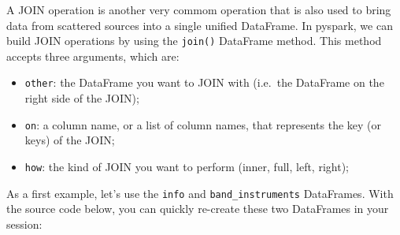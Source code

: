 \documentclass[
  11pt,
  letterpaper,
  DIV=11,
  numbers=noendperiod]{scrreprt}
\providecommand{\tightlist}{%
  \setlength{\itemsep}{0pt}\setlength{\parskip}{0pt}}\usepackage{longtable,booktabs,array}
\begin{document}
A JOIN operation is another very commom operation that is also used to
bring data from scattered sources into a single unified DataFrame. In
pyspark, we can build JOIN operations by using the \texttt{join()}
DataFrame method. This method accepts three arguments, which are:

\begin{itemize}
\tightlist
\item
  \texttt{other}: the DataFrame you want to JOIN with (i.e.~the
  DataFrame on the right side of the JOIN);
\item
  \texttt{on}: a column name, or a list of column names, that represents
  the key (or keys) of the JOIN;
\item
  \texttt{how}: the kind of JOIN you want to perform (inner, full, left,
  right);
\end{itemize}

As a first example, let's use the \texttt{info} and
\texttt{band\_instruments} DataFrames. With the source code below, you
can quickly re-create these two DataFrames in your session:
\end{document}
